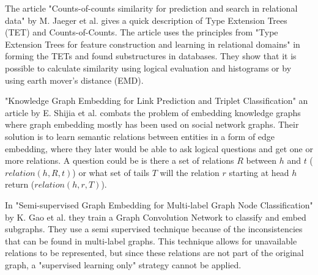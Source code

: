 The article "Counts-of-counts similarity for prediction and search in relational data" by M. Jaeger et al.\cite{jaeger2019counts} gives a quick description of Type Extension Trees (TET) and Counts-of-Counts. The article uses the principles from "Type Extension Trees for feature construction and learning in relational domains" in forming the TETs and found substructures in databases. They show that it is possible to calculate similarity using logical evaluation and histograms or by using earth mover's distance (EMD).

"Knowledge Graph Embedding for Link Prediction and Triplet Classification" an article by E. Shijia et al. \cite{10.1007/978-981-10-3168-7_23} combats the problem of embedding knowledge graphs where graph embedding mostly has been used on social network graphs. Their solution is to learn semantic relations between entities in a form of edge embedding, where they later would be able to ask logical questions and get one or more relations. A question could be is there a set of relations $R$ between $h$ and $t$ ($relation(h,R,t)$) or what set of tails $T$ will the relation $r$ starting at head $h$ return ($relation(h,r,T)$).

In "Semi-supervised Graph Embedding for Multi-label Graph Node Classification" by K. Gao et al.\cite{10.1007/978-3-030-34223-4_35} they train a Graph Convolution Network to classify and embed subgraphs. They use a semi supervised technique because of the inconsistencies that can be found in multi-label graphs. This technique allows for unavailable relations to be represented, but since these relations are not part of the original graph, a "supervised learning only" strategy cannot be applied.

